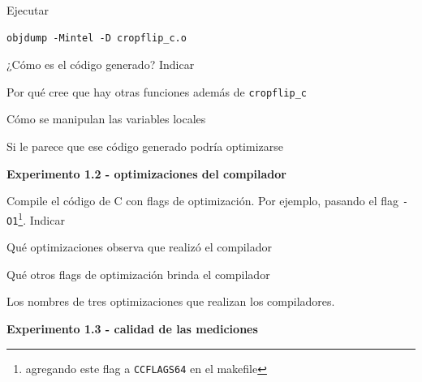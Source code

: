Ejecutar 
\begin{codesnippet}
\begin{verbatim}
objdump -Mintel -D cropflip_c.o
\end{verbatim}
\end{codesnippet}

¿Cómo es el código generado? 
Indicar
\begin{inparaenum}
    \item Por qué cree que hay otras funciones además de \verb|cropflip_c|
    \item Cómo se manipulan las variables locales
    \item Si le parece que ese código generado podría optimizarse
\end{inparaenum}

\vspace*{0.3cm} \noindent
\textbf{Experimento 1.2 - optimizaciones del compilador}

Compile el código de C con flags de optimización. Por ejemplo, pasando el flag 
\verb|-O1|\footnote{agregando este flag a \texttt{CCFLAGS64} en el makefile}. 
Indicar
\begin{inparaenum}
    \item Qué optimizaciones observa que realizó el compilador
    \item Qué otros flags de optimización brinda el compilador
    \item Los nombres de tres optimizaciones que realizan los compiladores.
\end{inparaenum}

\vspace*{0.3cm} \noindent
\textbf{Experimento 1.3 - calidad de las mediciones}

